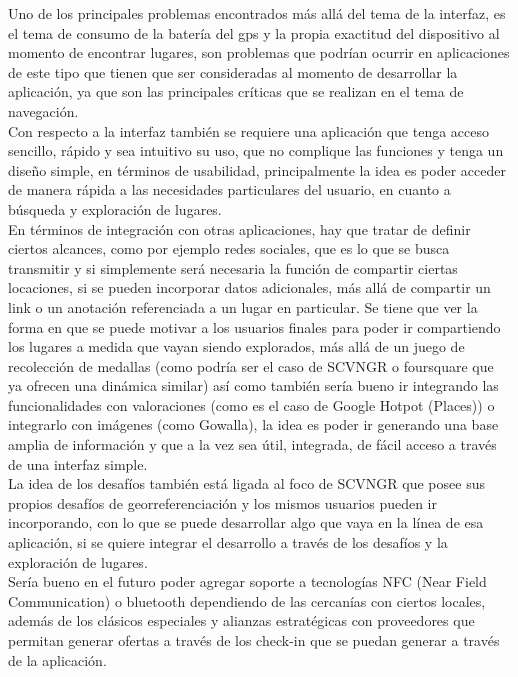 \documentclass[10pt,letterpaper]{article}
\begin{document}
Uno de los principales problemas encontrados más allá del tema de la interfaz, es el tema de consumo de la batería del gps y la propia exactitud del dispositivo al momento de encontrar lugares, son problemas que podrían ocurrir en aplicaciones de este tipo que tienen que ser consideradas al momento de desarrollar la aplicación, ya que son las principales críticas que se realizan en el tema de navegación.\\

Con respecto a la interfaz también se requiere una aplicación que tenga acceso sencillo, rápido y sea intuitivo su uso, que no complique las funciones y tenga un diseño simple, en términos de usabilidad, principalmente la idea es poder acceder de manera rápida a las necesidades particulares del usuario, en cuanto a búsqueda y exploración de lugares.\\

En términos de integración con otras aplicaciones, hay que tratar de definir ciertos alcances, como por ejemplo redes sociales, que es lo que se busca transmitir y si simplemente será necesaria la función de compartir ciertas locaciones, si se pueden incorporar datos adicionales, más allá de compartir un link o un anotación referenciada a un lugar en particular. Se tiene que ver la forma en que se puede motivar a los usuarios finales para poder ir compartiendo los lugares a medida que vayan siendo explorados, más allá de un juego de recolección de medallas (como podría ser el caso de SCVNGR o foursquare que ya ofrecen una dinámica similar) así como también sería bueno ir integrando las funcionalidades con valoraciones (como es el caso de Google Hotpot (Places)) o integrarlo con imágenes (como Gowalla), la idea es poder ir generando una base amplia de información y que a la vez sea útil, integrada, de fácil acceso a través de una interfaz simple.\\

La idea de los desafíos también está ligada al foco de SCVNGR que posee sus propios desafíos de georreferenciación y los mismos usuarios pueden ir incorporando, con lo que se puede desarrollar algo que vaya en la línea de esa aplicación, si se quiere integrar el desarrollo a través de los desafíos y la exploración de lugares.\\

Sería bueno en el futuro poder agregar soporte a tecnologías NFC (Near Field Communication) o bluetooth dependiendo de las cercanías con ciertos locales, además de los clásicos especiales y alianzas estratégicas con proveedores que permitan generar ofertas a través de los check-in que se puedan generar a través de la aplicación.\\
\end{document}
